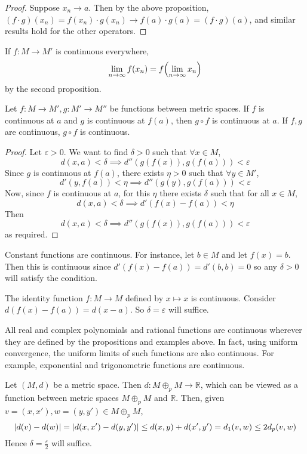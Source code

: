 \begin{proof}
	Suppose \( x_n \to a \).
	Then by the above proposition, \( (f\cdot g)(x_n) = f(x_n) \cdot g(x_n) \to f(a) \cdot g(a) = (f \cdot g)(a) \), and similar results hold for the other operators.
\end{proof}
\begin{remark}
	If \( f \colon M \to M' \) is continuous everywhere,
	\[
		\lim_{n \to \infty} f(x_n) = f\qty(\lim_{n \to \infty} x_n)
	\]
	by the second proposition.
\end{remark}
\begin{proposition}
	Let \( f \colon M \to M', g \colon M' \to M'' \) be functions between metric spaces.
	If \( f \) is continuous at \( a \) and \( g \) is continuous at \( f(a) \), then \( g \circ f \) is continuous at \( a \).
	If \( f,g \) are continuous, \( g \circ f \) is continuous.
\end{proposition}
\begin{proof}
	Let \( \varepsilon > 0 \).
	We want to find \( \delta > 0 \) such that \( \forall x \in M \),
	\[ d(x,a) < \delta \implies d''(g(f(x)), g(f(a))) < \varepsilon \]
	Since \( g \) is continuous at \( f(a) \), there exists \( \eta > 0 \) such that \( \forall y \in M' \),
	\[ d'(y,f(a)) < \eta \implies d''(g(y), g(f(a))) < \varepsilon \]
	Now, since \( f \) is continuous at \( a \), for this \( \eta \) there exists \( \delta \) such that for all \( x \in M \),
	\[ d(x,a) < \delta \implies d'(f(x) - f(a)) < \eta \]
	Then
	\[ d(x,a) < \delta \implies d''(g(f(x)), g(f(a))) < \varepsilon \]
	as required.
\end{proof}

\begin{example}
	Constant functions are continuous.
	For instance, let \( b \in M \) and let \( f(x) = b \).
	Then this is continuous since \( d'(f(x) - f(a)) = d'(b,b) = 0 \) so any \( \delta > 0 \) will satisfy the condition.
\end{example}
\begin{example}
	The identity function \( f \colon M \to M \) defined by \( x \mapsto x \) is continuous.
	Consider \( d(f(x) - f(a)) = d(x-a) \).
	So \( \delta = \varepsilon \) will suffice.
\end{example}
\begin{example}
	All real and complex polynomials and rational functions are continuous wherever they are defined by the propositions and examples above.
	In fact, using uniform convergence, the uniform limits of such functions are also continuous.
	For example, exponential and trigonometric functions are continuous.
\end{example}
\begin{example}
	Let \( (M, d) \) be a metric space.
	Then \( d \colon M \oplus_p M \to \mathbb R \), which can be viewed as a function between metric spaces \( M \oplus_p M \) and \( \mathbb R \).
	Then, given \( v = (x,x'), w = (y,y') \in M \oplus_p M \),
	\[
		\abs{d(v) - d(w)} = \abs{d(x,x') - d(y,y')} \leq d(x,y) + d(x',y') = d_1(v,w) \leq 2 d_p(v,w)
	\]
	Hence \( \delta = \frac{\varepsilon}{2} \) will suffice.
\end{example}

